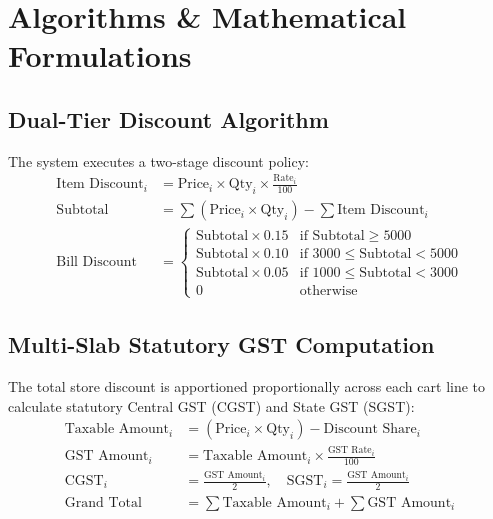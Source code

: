 \documentclass[12pt,a4paper]{article}
\begin{document}
\section{Algorithms \& Mathematical Formulations}

\subsection{Dual-Tier Discount Algorithm}
The system executes a two-stage discount policy:
\begin{align}
    \text{Item Discount}_i &= \text{Price}_i \times \text{Qty}_i \times \frac{\text{Rate}_i}{100} \\
    \text{Subtotal} &= \sum (\text{Price}_i \times \text{Qty}_i) - \sum \text{Item Discount}_i \\
    \text{Bill Discount} &= 
    \begin{cases}
        \text{Subtotal} \times 0.15 & \text{if Subtotal} \ge 5000 \\
        \text{Subtotal} \times 0.10 & \text{if } 3000 \le \text{Subtotal} < 5000 \\
        \text{Subtotal} \times 0.05 & \text{if } 1000 \le \text{Subtotal} < 3000 \\
        0 & \text{otherwise}
    \end{cases}
\end{align}

\subsection{Multi-Slab Statutory GST Computation}
The total store discount is apportioned proportionally across each cart line to calculate statutory Central GST (CGST) and State GST (SGST):
\begin{align}
    \text{Taxable Amount}_i &= (\text{Price}_i \times \text{Qty}_i) - \text{Discount Share}_i \\
    \text{GST Amount}_i &= \text{Taxable Amount}_i \times \frac{\text{GST Rate}_i}{100} \\
    \text{CGST}_i &= \frac{\text{GST Amount}_i}{2}, \quad \text{SGST}_i = \frac{\text{GST Amount}_i}{2} \\
    \text{Grand Total} &= \sum \text{Taxable Amount}_i + \sum \text{GST Amount}_i
\end{align}
\end{document}
